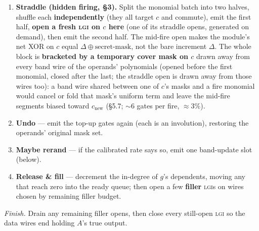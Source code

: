 \documentclass[11pt]{article}
\newcommand{\doc}[1]{\texttt{#1}}
\newcommand{\xor}{\oplus}
\newcommand{\lgi}{\textsc{lgi}}
\begin{document}
\begin{enumerate}
  measurement: draw the ancilla \textbf{per term}, excluding the target, the operands and
  the term's own wires; never a wire whose \textbf{own open masks contain the pair being
  XORed}; \textbf{cross-operand} groupings checked against the pairs open on any data
  wire, so no ancilla holds a mask's own quadratic term; and draw from the \textbf{band}
  (\doc{BV5\_ANC\_POOL=all} also lends data wires, but a product XORed onto a masked data
  wire can partially cancel that wire's mask).
\item \textbf{Straddle (hidden firing, \S3).} Split the monomial batch into two
  halves, shuffle each \textbf{independently} (they all target $c$ and commute),
  emit the first half, \textbf{open a fresh \lgi{} on $c$ here} (one of its straddle
  opens, generated on demand), then emit the second half. The mid-fire open makes
  the module's net XOR on $c$ equal $\Delta \xor \text{secret-mask}$, not the bare
  increment $\Delta$.
  The whole block is \textbf{bracketed by a temporary cover mask on $c$} drawn
  away from every band wire of the operands' polynomials (opened before the
  first monomial, closed after the last; the straddle open is drawn away from
  those wires too): a band wire shared between one of $c$'s masks and a fire
  monomial would cancel or fold that mask's uniform term and leave the mid-fire
  segments biased toward $c_{\mathrm{new}}$ (\S5.7; ${\sim}6$ gates per fire,
  ${\approx}3\%$).
\item \textbf{Undo} --- emit the top-up gates again (each is an involution),
  restoring the operands' original mask set.
\item \textbf{Maybe rerand} --- if the calibrated rate says so, emit one
  band-update slot (below).
\item \textbf{Release \& fill} --- decrement the in-degree of $g$'s dependents,
  moving any that reach zero into the ready queue; then open a few \textbf{filler}
  \lgi s on wires chosen by remaining filler budget.
\end{enumerate}

\emph{Finish.} Drain any remaining filler opens, then close every still-open
\lgi{} so the data wires end holding $A$'s true output.
\end{document}
